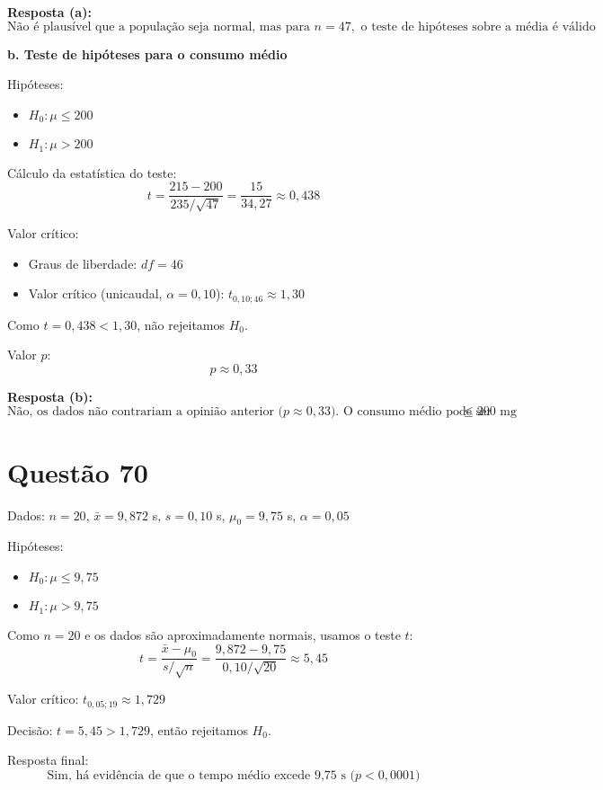\documentclass[12pt]{article}
\newcommand{\quest}[1]{\section*{Questão #1}} %
\begin{document}
\textbf{Resposta (a):}
\[
\boxed{\text{Não é plausível que a população seja normal, mas para } n = 47, \text{ o teste de hipóteses sobre a média é válido}}
\]

\textbf{b. Teste de hipóteses para o consumo médio}

Hipóteses:
\begin{itemize}
  \item $H_0: \mu \leq 200$
  \item $H_1: \mu > 200$
\end{itemize}

Cálculo da estatística do teste:
\[
t = \frac{215 - 200}{235 / \sqrt{47}} = \frac{15}{34{,}27} \approx 0{,}438
\]

Valor crítico:
\begin{itemize}
  \item Graus de liberdade: $df = 46$
  \item Valor crítico (unicaudal, $\alpha = 0{,}10$): $t_{0{,}10; 46} \approx 1{,}30$
\end{itemize}

Como $t = 0{,}438 < 1{,}30$, não rejeitamos $H_0$.

Valor $p$:
\[
p \approx 0{,}33
\]

\textbf{Resposta (b):}
\[
\boxed{\text{Não, os dados não contrariam a opinião anterior ($p \approx 0{,}33$). O consumo médio pode ser } \leq 200 \text{ mg}}
\]





\quest{70}

Dados: $n = 20$, $\bar{x} = 9{,}872$ s, $s = 0{,}10$ s, $\mu_0 = 9{,}75$ s, $\alpha = 0{,}05$

Hip\'oteses:
\begin{itemize}
  \item $H_0: \mu \leq 9{,}75$
  \item $H_1: \mu > 9{,}75$
\end{itemize}

Como $n = 20$ e os dados s\~ao aproximadamente normais, usamos o teste $t$:
\[
t = \frac{\bar{x} - \mu_0}{s / \sqrt{n}} = \frac{9{,}872 - 9{,}75}{0{,}10 / \sqrt{20}} \approx 5{,}45
\]

Valor cr\'itico: $t_{0{,}05; 19} \approx 1{,}729$

Decis\~ao: $t = 5{,}45 > 1{,}729$, ent\~ao rejeitamos $H_0$.

Resposta final:
\[
\boxed{\text{Sim, h\'a evid\^encia de que o tempo m\'edio excede 9{,}75 s ($p < 0{,}0001$)}}
\] 
\end{document}
